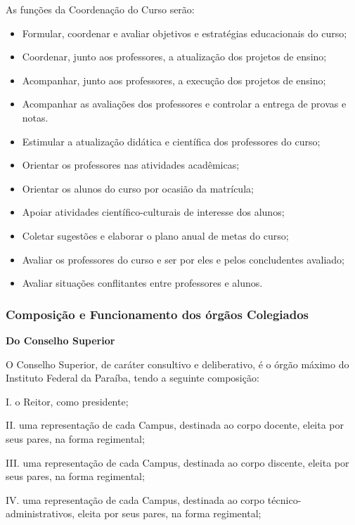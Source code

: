 As funções da Coordenação do Curso serão:
\begin{itemize}
\item Formular, coordenar e avaliar objetivos e estratégias educacionais do curso;
\item Coordenar, junto aos professores, a atualização dos projetos de ensino;
\item Acompanhar, junto aos professores, a execução dos projetos de ensino;
\item Acompanhar as avaliações dos professores e controlar a entrega de provas e notas.
\item Estimular a atualização didática e científica dos professores do curso;
\item Orientar os professores nas atividades acadêmicas;
\item Orientar os alunos do curso por ocasião da matrícula;
\item Apoiar atividades científico-culturais de interesse dos alunos;
\item Coletar sugestões e elaborar o plano anual de metas do curso;
\item Avaliar os professores do curso e ser por eles e pelos concludentes avaliado;
\item Avaliar situações conflitantes entre professores e alunos.
\end{itemize}

\subsubsection{Composição e Funcionamento dos órgãos Colegiados}

\vspace{4mm}
\textbf{Do Conselho Superior}
\vspace{4mm}

O Conselho Superior, de caráter consultivo e deliberativo, é o órgão máximo do Instituto Federal da Paraíba, tendo a seguinte composição:

I.	o Reitor, como presidente;

II.	uma representação de cada Campus, destinada ao corpo docente, eleita por seus pares, na forma regimental;

III.	uma representação de cada Campus, destinada ao corpo discente, eleita por seus pares, na forma regimental;

IV.	uma representação de cada Campus, destinada ao corpo técnico-administrativos, eleita por seus pares, na forma regimental;


